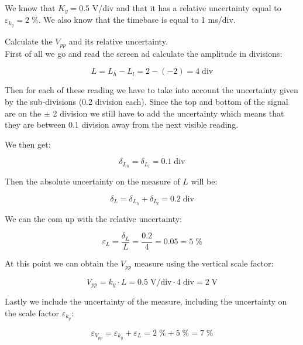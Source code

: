 \documentclass[../main.tex]{subfiles}
\begin{document}
We know that $K_y = 0.5$ V/div and that it has a relative uncertainty equal to $\varepsilon_{k_y} = 2\;\%$. We also know that the timebase is equal to 1 ms/div.

Calculate the $V_{pp}$ and its relative uncertainty.\\

First of all we go and read the screen ad calculate the amplitude in divisions:

\begin{equation}
	L = L_h - L_l = 2 - (-2) = 4 \; \text{div} 
\end{equation}

Then for each of these reading we have to take into account the uncertainty given by the sub-divisions (0.2 division each). Since the top and bottom of the signal are on the $\pm$ 2 division we still have to add the uncertainty which means that they are between 0.1 division away from the next visible reading.

We then get:

\begin{equation}
	\delta_{L_h} = \delta_{L_l} = 0.1  \; \text{div} 
\end{equation}

Then the absolute uncertainty on the measure of $L$ will be:

\begin{equation}
	\delta_L = \delta_{L_h} + \delta_{L_l} = 0.2\; \text{div} 
\end{equation}

We can the com up with the relative uncertainty:

\begin{equation}
	\varepsilon_L = \frac{\delta_L}{L} = \frac{0.2}{4} = 0.05 = 5\;\%
\end{equation}

At this point we can obtain the $V_{pp}$ measure using the vertical scale factor:

\begin{equation}
	V_{pp} = k_y \cdot L = 0.5 \; \text{V/div} \cdot 4  \; \text{div} = 2 \; \text{V}
\end{equation}

Lastly we include the uncertainty of the measure, including the uncertainty on the scale factor $\varepsilon_{k_y}$:

\begin{equation}
	\varepsilon_{V_{pp}} = \varepsilon_{k_y} + \varepsilon_{L} = 2\;\% + 5\;\% = 7\;\%  
\end{equation}
\end{document}
